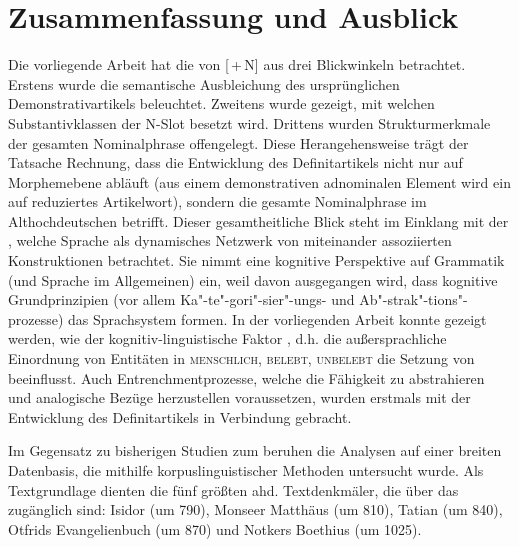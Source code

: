 \chapter{Zusammenfassung und Ausblick}\label{kapitel:zusammenfassung}

Die vorliegende Arbeit hat die  von [\,+\,N] aus drei Blickwinkeln betrachtet. Erstens wurde die semantische Ausbleichung des ursprünglichen Demonstrativartikels  beleuchtet. Zweitens wurde gezeigt, mit welchen Substantivklassen  der N-Slot besetzt wird. Drittens wurden Strukturmerkmale  der gesamten Nominalphrase  offengelegt. 
Diese Herangehensweise trägt der Tatsache Rechnung, dass die Entwicklung des Definitartikels  nicht nur auf Morphemebene  abläuft (aus einem demonstrativen adnominalen Element wird ein auf  reduziertes Artikelwort), sondern die gesamte Nominalphrase  im Althochdeutschen betrifft. Dieser gesamtheitliche Blick steht im Einklang mit der , welche Sprache als dynamisches Netzwerk von miteinander assoziierten Konstruktionen  betrachtet. Sie nimmt eine kognitive Perspektive auf Grammatik (und Sprache im Allgemeinen) ein, weil davon ausgegangen wird, dass kognitive Grundprinzipien (vor allem Ka"-te"-gori"-sier"-ungs- und Ab"-strak"-tions"-prozesse) das Sprachsystem formen. In der vorliegenden Arbeit konnte gezeigt werden, wie der kognitiv-linguistische Faktor , d.h. die außersprachliche Einordnung von Entitäten in \textsc{menschlich, belebt, unbelebt} die Setzung von  beeinflusst. Auch  Entrenchmentprozesse, welche die Fähigkeit zu abstrahieren und analogische  Bezüge herzustellen voraussetzen, wurden erstmals mit der Entwicklung des Definitartikels  in Verbindung gebracht.

Im Gegensatz zu bisherigen Studien zum  beruhen die Analysen auf einer breiten Datenbasis, die mithilfe korpuslinguistischer Methoden  untersucht wurde. Als Textgrundlage  dienten die fünf größten ahd. Textdenkmäler, die über das  zugänglich sind: Isidor (um 790), Monseer Matthäus (um 810), Tatian (um 840), Otfrids Evangelienbuch (um 870) und Notkers Boethius (um 1025). 

